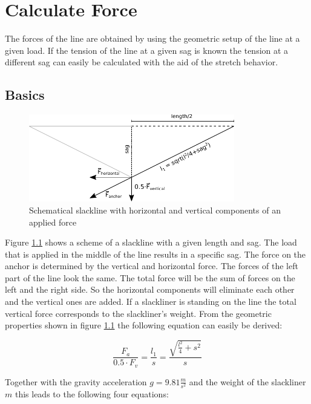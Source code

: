 \chapter{Calculate Force} \label{sec:calculateForce}
The forces of the line are obtained by using the geometric setup of the line at a given load. If the tension of the line at a given sag is known the tension at a different sag can easily be calculated with the aid of the stretch behavior.

\section{Basics} \label{sec:basics}

\begin{figure}[htb] \centering
	\includegraphics[width=0.8\textwidth]{images/slacklineWithForces.pdf}
	\caption{Schematical slackline with horizontal and vertical components of an applied force}
	\label{fig:slacklineWithForces}
\end{figure}

Figure \ref{fig:slacklineWithForces} shows a scheme of a slackline with a given length and sag. The load that is applied in the middle of the line results in a specific sag. The force on the anchor is determined by the vertical and horizontal force. The forces of the left part of the line look the same. The total force will be the sum of forces on the left and the right side. So the horizontal components will eliminate each other and the vertical ones are added. If a slackliner is standing on the line the total vertical force corresponds to the slackliner's weight. From the geometric properties shown in figure \ref{fig:slacklineWithForces} the following equation can easily be derived:


\begin{equation}
	\frac{F_a}{0.5\cdot F_v} = \frac{l_1}{s} = \frac{\sqrt{\frac{l^2}{4} + s^2}}{s}
\end{equation}

Together with the gravity acceleration $g = 9.81\frac{m}{s^2}$ and the weight of the slackliner $m$ this leads to the following four equations:

